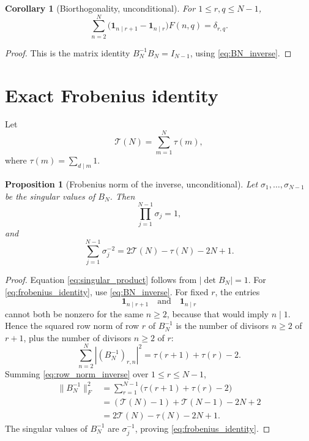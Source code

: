 \documentclass[11pt]{amsart}
\numberwithin{equation}{section}
\theoremstyle{plain}
\newtheorem{proposition}[theorem]{Proposition}
\newtheorem{corollary}[theorem]{Corollary}
\theoremstyle{definition}
\theoremstyle{remark}
\newcommand{\one}{\mathbf 1}
\newcommand{\Fsurf}{F}
\newcommand{\TauSum}{\mathcal T}
\begin{document}
\begin{corollary}[Biorthogonality, unconditional]
\label{cor:biorthogonality}
For \(1\le r,q\le N-1\),
\begin{equation}
\sum_{n=2}^{N}\bigl(\one_{n\mid r+1}-\one_{n\mid r}\bigr)\Fsurf(n,q)=\delta_{r,q}.
\label{eq:biorthogonality}
\end{equation}
\end{corollary}

\begin{proof}
This is the matrix identity \(B_N^{-1}B_N=I_{N-1}\), using \eqref{eq:BN_inverse}.
\end{proof}

\section{Exact Frobenius identity}
\label{sec:frobenius}

Let
\begin{equation}
\TauSum(N)=\sum_{m=1}^{N}\tau(m),
\label{eq:TauSum_def}
\end{equation}
where \(\tau(m)=\sum_{d\mid m}1\).

\begin{proposition}[Frobenius norm of the inverse, unconditional]
\label{prop:frobenius}
Let \(\sigma_1,\ldots,\sigma_{N-1}\) be the singular values of \(B_N\).  Then
\begin{equation}
\prod_{j=1}^{N-1}\sigma_j=1,
\label{eq:singular_product}
\end{equation}
and
\begin{equation}
\sum_{j=1}^{N-1}\sigma_j^{-2}=2\TauSum(N)-\tau(N)-2N+1.
\label{eq:frobenius_identity}
\end{equation}
\end{proposition}

\begin{proof}
Equation \eqref{eq:singular_product} follows from \(|\det B_N|=1\).  For \eqref{eq:frobenius_identity}, use \eqref{eq:BN_inverse}.  For fixed \(r\), the entries
\begin{equation}
\one_{n\mid r+1}\quad\text{and}\quad \one_{n\mid r}
\label{eq:disjoint_entries}
\end{equation}
cannot both be nonzero for the same \(n\ge2\), because that would imply \(n\mid1\).  Hence the squared row norm of row \(r\) of \(B_N^{-1}\) is the number of divisors \(n\ge2\) of \(r+1\), plus the number of divisors \(n\ge2\) of \(r\):
\begin{equation}
\sum_{n=2}^{N}|(B_N^{-1})_{r,n}|^2=\tau(r+1)+\tau(r)-2.
\label{eq:row_norm_inverse}
\end{equation}
Summing \eqref{eq:row_norm_inverse} over \(1\le r\le N-1\),
\begin{align}
\|B_N^{-1}\|_F^2
&=\sum_{r=1}^{N-1}\bigl(\tau(r+1)+\tau(r)-2\bigr) \\
&=(\TauSum(N)-1)+\TauSum(N-1)-2N+2 \\
&=2\TauSum(N)-\tau(N)-2N+1.
\label{eq:frobenius_sum}
\end{align}
The singular values of \(B_N^{-1}\) are \(\sigma_j^{-1}\), proving \eqref{eq:frobenius_identity}.
\end{proof}
\end{document}
